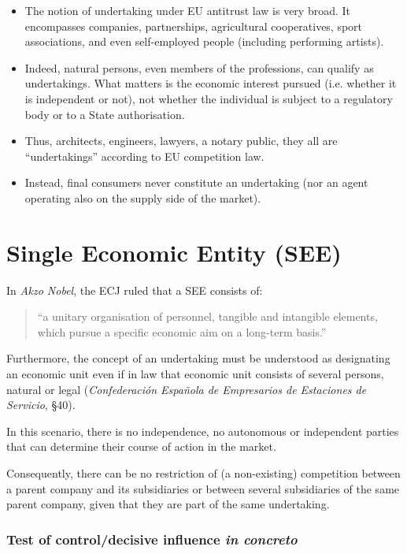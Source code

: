     \begin{itemize}
        \item The notion of undertaking under EU antitrust law is very broad. It encompasses companies, partnerships, agricultural cooperatives, sport associations, and even self-employed people (including performing artists).
        \item Indeed, natural persons, even members of the professions, can qualify as undertakings. What matters is the economic interest pursued (i.e. whether it is independent or not), not whether the individual is subject to a regulatory body or to a State authorisation.
        \item Thus, architects, engineers, lawyers, a notary public, they all are ``undertakings'' according to EU competition law.
        \item Instead, final consumers never constitute an undertaking (nor an agent operating also on the supply side of the market).
    \end{itemize}

\section{Single Economic Entity (SEE)}

    In \textit{Akzo Nobel}, the ECJ ruled that a SEE consists of:
    \begin{quote}
    ``a unitary organisation of personnel, tangible and intangible elements, which pursue a specific economic aim on a long-term basis.''
    \end{quote}
    
    Furthermore, the concept of an undertaking must be understood as designating an economic unit even if in law that economic unit consists of several persons, natural or legal (\textit{Confederación Española de Empresarios de Estaciones de Servicio}, §40).
    
    In this scenario, there is no independence, no autonomous or independent parties that can determine their course of action in the market.
    
    Consequently, there can be no restriction of (a non-existing) competition between a parent company and its subsidiaries or between several subsidiaries of the same parent company, given that they are part of the same undertaking.

        \subsubsection{Test of control/decisive influence \textit{in concreto}}

